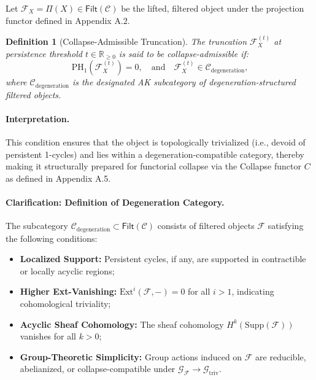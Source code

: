 \documentclass[11pt]{article}
\newtheorem{definition}[theorem]{Definition}
\begin{document}
Let \( \mathcal{F}_X = \Pi(X) \in \mathsf{Filt}(\mathcal{C}) \) be the lifted, filtered object under the projection functor defined in Appendix A.2.

\begin{definition}[Collapse-Admissible Truncation]
The truncation \( \mathcal{F}_X^{(t)} \) at persistence threshold \( t \in \mathbb{R}_{\geq 0} \) is said to be \emph{collapse-admissible} if:
\[
\mathrm{PH}_1(\mathcal{F}_X^{(t)}) = 0, \quad \text{and} \quad \mathcal{F}_X^{(t)} \in \mathcal{C}_{\mathrm{degeneration}},
\]
where \( \mathcal{C}_{\mathrm{degeneration}} \) is the designated AK subcategory of degeneration-structured filtered objects.
\end{definition}

\paragraph{Interpretation.}  
This condition ensures that the object is topologically trivialized (i.e., devoid of persistent 1-cycles) and lies within a degeneration-compatible category, thereby making it structurally prepared for functorial collapse via the Collapse functor \( C \) as defined in Appendix A.5.

\paragraph{Clarification: Definition of Degeneration Category.}  
The subcategory \( \mathcal{C}_{\mathrm{degeneration}} \subset \mathsf{Filt}(\mathcal{C}) \) consists of filtered objects \( \mathcal{F} \) satisfying the following conditions:

\begin{itemize}
    \item \textbf{Localized Support:} Persistent cycles, if any, are supported in contractible or locally acyclic regions;
    \item \textbf{Higher Ext-Vanishing:} \( \mathrm{Ext}^i(\mathcal{F}, -) = 0 \) for all \( i > 1 \), indicating cohomological triviality;
    \item \textbf{Acyclic Sheaf Cohomology:} The sheaf cohomology \( H^k(\mathrm{Supp}(\mathcal{F})) \) vanishes for all \( k > 0 \);
    \item \textbf{Group-Theoretic Simplicity:} Group actions induced on \( \mathcal{F} \) are reducible, abelianized, or collapse-compatible under \( \mathcal{G}_{\mathcal{F}} \to \mathcal{G}_{\mathrm{triv}} \).
\end{itemize}
\end{document}
